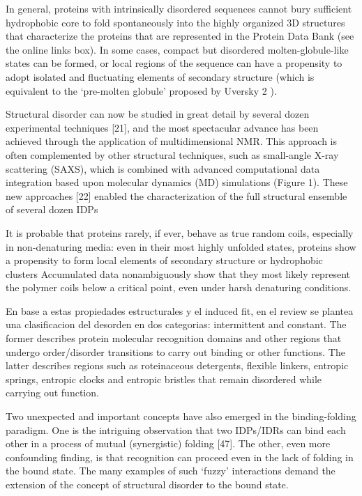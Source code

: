 In general, proteins with intrinsically disordered sequences cannot bury sufficient hydrophobic core to fold spontaneously into the highly organized 3D structures that characterize the proteins that are represented in the Protein Data Bank (see the online links
box). In some cases, compact but disordered molten-globule-like states can be formed, or local regions of the sequence can have a propensity to adopt isolated and fluctuating elements of secondary structure (which is equivalent to the ‘pre-molten globule’ proposed by Uversky 2 ). 

Structural disorder can now be studied in great detail by several dozen experimental techniques [21], and the most spectacular advance has been achieved through the application of multidimensional NMR. This approach is often
complemented by other structural techniques, such as small-angle X-ray scattering (SAXS), which is combined with advanced computational data integration based upon molecular dynamics (MD) simulations (Figure 1). These new
approaches [22] enabled the characterization of the full structural ensemble of several dozen IDPs

It is probable that proteins rarely, if ever, behave as true random coils, especially in non-denaturing media: even in their most highly unfolded states, proteins show a propensity to form local elements of secondary structure or hydrophobic clusters
Accumulated data nonambiguously show that they most likely represent the polymer coils below a critical point, even under harsh denaturing conditions.




En base a estas propiedades estructurales y el induced fit, en el review \cite{dunker2001intrinsically} se plantea una clasificacion del desorden en dos categorias: intermittent and constant.
The former describes protein molecular recognition domains and other regions that undergo order/disorder transitions to carry out binding or other functions. The latter describes regions such as
roteinaceous detergents, flexible linkers, entropic springs, entropic clocks and entropic bristles that remain disordered while carrying out function.

Two unexpected and important concepts have also emerged in the binding-folding paradigm. One is the intriguing observation that two IDPs/IDRs can bind each other in a process of mutual (synergistic) folding [47].
The other, even more confounding finding, is that recognition can proceed even in the lack of folding in the bound state. 
The many examples of such ‘fuzzy’ interactions demand the extension of the concept of structural disorder to the bound state.




